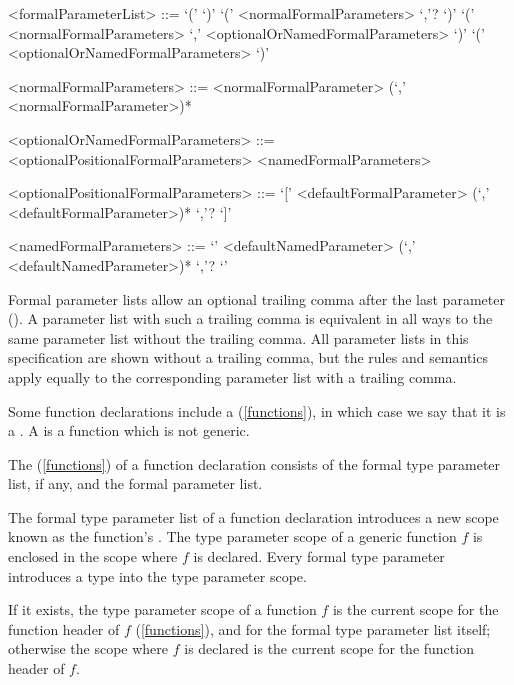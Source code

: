 \documentclass[makeidx]{article}
\begin{document}
\begin{grammar}
<formalParameterList> ::= `(' `)'
  \alt `(' <normalFormalParameters> `,'? `)'
  \alt `(' <normalFormalParameters> `,' <optionalOrNamedFormalParameters> `)'
  \alt `(' <optionalOrNamedFormalParameters> `)'

<normalFormalParameters> ::= \gnewline{}
  <normalFormalParameter> (`,' <normalFormalParameter>)*

<optionalOrNamedFormalParameters> ::= <optionalPositionalFormalParameters>
  \alt <namedFormalParameters>

<optionalPositionalFormalParameters> ::= \gnewline{}
  `[' <defaultFormalParameter> (`,' <defaultFormalParameter>)* `,'? `]'

<namedFormalParameters> ::= \gnewline{}
  `{' <defaultNamedParameter> (`,' <defaultNamedParameter>)* `,'? `}'
\end{grammar}

\LMHash{}%
Formal parameter lists allow an optional trailing comma
after the last parameter ().
A parameter list with such a trailing comma is
equivalent in all ways to the same parameter list without the trailing comma.
All parameter lists in this specification are shown without a trailing comma,
but the rules and semantics apply equally to
the corresponding parameter list with a trailing comma.

\LMHash{}%
Some function declarations include a
 (\ref{functions}),
in which case we say that it is a
.
A 
is a function which is not generic.

\LMHash{}%
The 
(\ref{functions})
of a function declaration consists of
the formal type parameter list, if any, and the formal parameter list.


\LMHash{}%
The formal type parameter list of a function declaration introduces
a new scope known as the function's
.
The type parameter scope of a generic function $f$ is enclosed in
the scope where $f$ is declared.
Every formal type parameter introduces a type into the type parameter scope.

\LMHash{}%
If it exists, the type parameter scope of a function $f$ is
the current scope for the function header of $f$
(\ref{functions}),
and for the formal type parameter list itself;
otherwise the scope where $f$ is declared is
the current scope for the function header of $f$.
\end{document}
